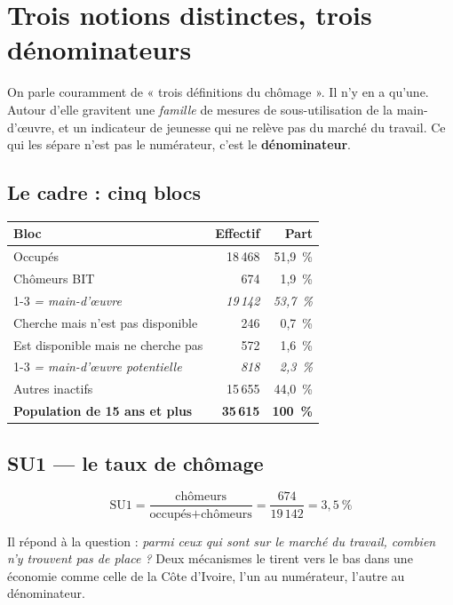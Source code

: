 \documentclass[11pt,a4paper]{article}
\begin{document}
\section{Trois notions distinctes, trois dénominateurs}

On parle couramment de « trois définitions du chômage ». Il n'y en a qu'une. Autour d'elle
gravitent une \emph{famille} de mesures de sous-utilisation de la main-d'\oe uvre, et un
indicateur de jeunesse qui ne relève pas du marché du travail. Ce qui les sépare n'est pas le
numérateur, c'est le \textbf{dénominateur}.

\subsection{Le cadre : cinq blocs}

\begin{center}
\small
\begin{tabular}{@{}lrr@{}}
\toprule
\textbf{Bloc} & \textbf{Effectif} & \textbf{Part} \\
\midrule
Occupés & 18\,468 & 51,9~\% \\
Chômeurs BIT & 674 & 1,9~\% \\
\cmidrule(r){1-3}
\emph{\quad = main-d'\oe uvre} & \emph{19\,142} & \emph{53,7~\%} \\
\addlinespace
Cherche mais n'est pas disponible & 246 & 0,7~\% \\
Est disponible mais ne cherche pas & 572 & 1,6~\% \\
\cmidrule(r){1-3}
\emph{\quad = main-d'\oe uvre potentielle} & \emph{818} & \emph{2,3~\%} \\
\addlinespace
Autres inactifs & 15\,655 & 44,0~\% \\
\midrule
\textbf{Population de 15 ans et plus} & \textbf{35\,615} & \textbf{100~\%} \\
\bottomrule
\end{tabular}
\end{center}

\subsection{SU1 --- le taux de chômage}

\[ \mathrm{SU1} = \frac{\text{chômeurs}}{\text{occupés} + \text{chômeurs}}
   = \frac{674}{19\,142} = 3{,}5~\% \]

Il répond à la question : \emph{parmi ceux qui sont sur le marché du travail, combien n'y trouvent
pas de place ?} Deux mécanismes le tirent vers le bas dans une économie comme celle de la Côte
d'Ivoire, l'un au numérateur, l'autre au dénominateur.
\end{document}
